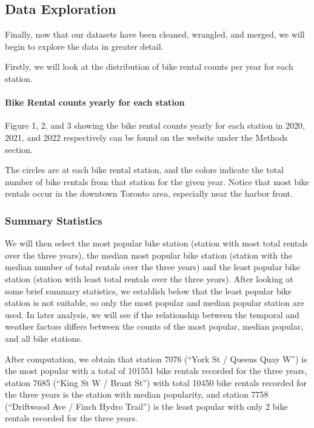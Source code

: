 \documentclass[
]{article}
\begin{document}
\hypertarget{data-exploration}{%
\subsection{Data Exploration}\label{data-exploration}}

Finally, now that our datasets have been cleaned, wrangled, and merged,
we will begin to explore the data in greater detail.

Firstly, we will look at the distribution of bike rental counts per year
for each station.

\hypertarget{bike-rental-counts-yearly-for-each-station}{%
\paragraph{Bike Rental counts yearly for each
station}\label{bike-rental-counts-yearly-for-each-station}}

Figure 1, 2, and 3 showing the bike rental counts yearly for each
station in 2020, 2021, and 2022 respectively can be found on the website
under the Methods section.

The circles are at each bike rental station, and the colors indicate the
total number of bike rentals from that station for the given year.
Notice that most bike rentals occur in the downtown Toronto area,
especially near the harbor front.

\hypertarget{summary-statistics}{%
\subsubsection{Summary Statistics}\label{summary-statistics}}

We will then select the most popular bike station (station with most
total rentals over the three years), the median most popular bike
station (station with the median number of total rentals over the three
years) and the least popular bike station (station with least total
rentals over the three years). After looking at some brief summary
statistics, we establish below that the least popular bike station is
not suitable, so only the most popular and median popular station are
used. In later analysis, we will see if the relationship between the
temporal and weather factors differs between the counts of the most
popular, median popular, and all bike stations.

After computation, we obtain that station 7076 (``York St / Queens Quay
W'') is the most popular with a total of 101551 bike rentals recorded
for the three years, station 7685 (``King St W / Brant St'') with total
10450 bike rentals recorded for the three years is the station with
median popularity, and station 7758 (``Driftwood Ave / Finch Hydro
Trail'') is the least popular with only 2 bike rentals recorded for the
three years.
\end{document}
